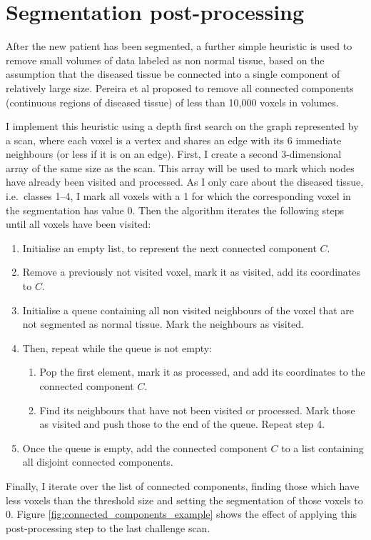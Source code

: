 \documentclass[12pt,a4paper,twoside,openright]{report}
\begin{document}
\section{Segmentation post-processing}
After the new patient has been segmented, a further simple heuristic is used to remove small volumes of data labeled as non normal tissue, based on the assumption that the diseased tissue be connected into a single component of relatively large size. Pereira et al \cite{pereira} proposed to remove all connected components (continuous regions of diseased tissue) of less than 10,000 voxels in volumes.

I implement this heuristic using a depth first search on the graph represented by a scan, where each voxel is a vertex and shares an edge with its 6 immediate neighbours (or less if it is on an edge). First, I create a second 3-dimensional array of the same size as the scan. This array will be used to mark which nodes have already been visited and processed. As I only care about the diseased tissue, i.e.\ classes 1--4, I mark all voxels with a 1 for which the corresponding voxel in the segmentation has value 0. Then the algorithm iterates the following steps until all voxels have been visited:
\begin{enumerate}
	\item Initialise an empty list, to represent the next connected component $C$.
	\item Remove a previously not visited voxel, mark it as visited, add its coordinates to $C$.
	\item Initialise a queue containing all non visited neighbours of the voxel that are not segmented as normal tissue. Mark the neighbours as visited.
	\item Then, repeat while the queue is not empty:
	\begin{enumerate}
		\item Pop the first element, mark it as processed, and add its coordinates to the connected component $C$.
		\item Find its neighbours that have not been visited or processed. Mark those as visited and push those to the end of the queue. Repeat step 4.
	\end{enumerate}
	\item Once the queue is empty, add the connected component $C$ to a list containing all disjoint connected components.
\end{enumerate}
Finally, I iterate over the list of connected components, finding those which have less voxels than the threshold size and setting the segmentation of those voxels to 0. Figure \ref{fig:connected_components_example} shows the effect of applying this post-processing step to the last challenge scan.
\end{document}
